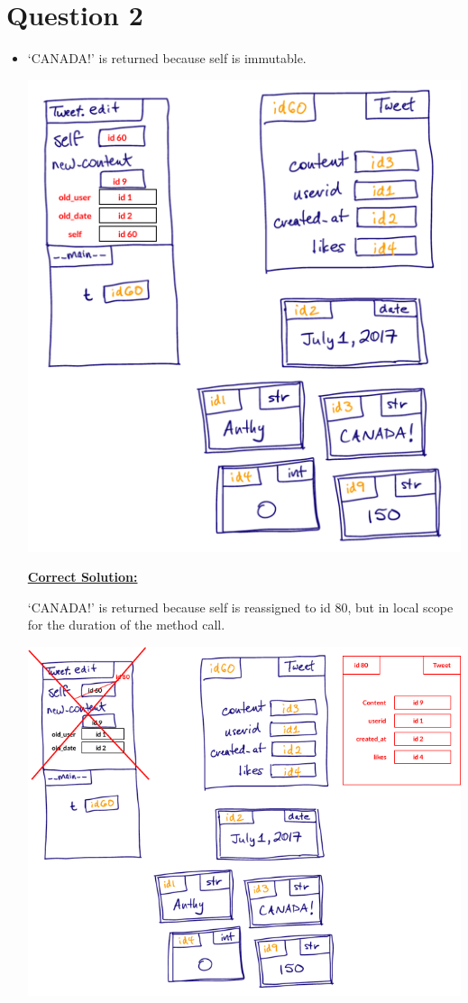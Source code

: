 \documentclass[12pt]{article}
\begin{document}
\section*{Question 2}
\begin{itemize}
    \item `CANADA!' is returned because self is immutable.

    \begin{center}
    \includegraphics[width=0.7\linewidth]{images/worksheet_3_q2_solution.png}
    \end{center}

    \newpage

    \begin{mdframed}
        \underline{\textbf{Correct Solution:}}

        \bigskip

        `CANADA!' is returned because self is \color{red}reassigned to id 80, but in local scope
        for the duration of the method call\color{black}.

        \begin{center}
        \includegraphics[width=0.7\linewidth]{images/worksheet_3_q2_correction.png}
        \end{center}
    \end{mdframed}


\end{itemize}
\end{document}
